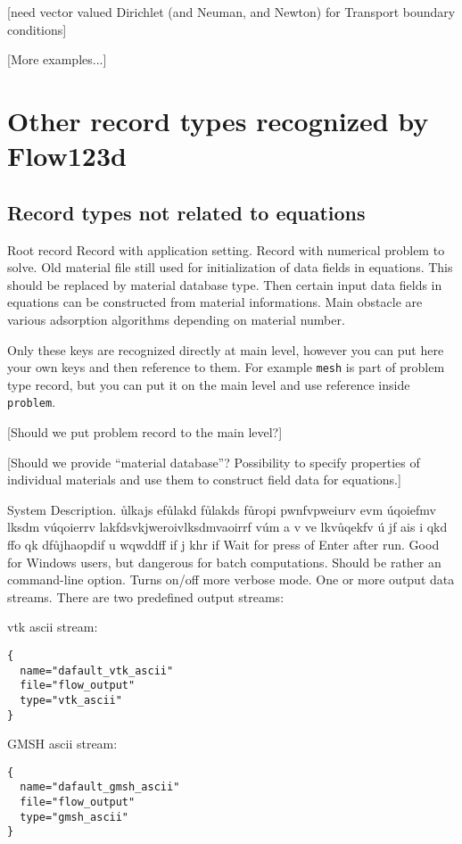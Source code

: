 [need vector valued Dirichlet (and Neuman, and Newton) for Transport boundary conditions]

[More examples...]


\section{Other record types recognized by Flow123d}

\subsection{Record types not related to equations}

\begin{recordtype}{Root record}{}
  Record with application setting.
  Record with numerical problem to solve. 
    Old material file still used for initialization of data fields in equations. 
    This should be replaced by material database type. Then certain input data fields in equations can be 
    constructed from material informations. Main obstacle are various adsorption algorithms depending on material number.
\end{recordtype}

Only these  keys are recognized directly at main level, however you can put here your own keys and then reference
to them. For example \verb'mesh' is part of problem type record, but you can put it on the main level and use reference 
inside \verb'problem'. 

[Should we put problem record to the main level?]

[Should we provide ``material database''? Possibility to specify properties of individual materials and use them to construct
 field data for equations.]

\begin{recordtype}{System}{}
Description. ůlkajs efůlakd fůlakds fůropi pwnfvpweiurv evm úqoiefmv lksdm vúqoierrv lakfdsvkjweroivlksdmvaoirrf vúm a v ve lkvůqekfv ú
jf ais i qkd ffo qk dfůjhaopdif  u wqwddff if j khr if
Wait for press of Enter after run. Good for Windows users, but dangerous for batch computations. 
Should be rather an command-line option.
Turns on/off more verbose mode. 
One or more output data streams.
There are two predefined output streams:


vtk ascii stream:
\begin{verbatim}
{
  name="dafault_vtk_ascii"
  file="flow_output"
  type="vtk_ascii"
}
\end{verbatim}

GMSH ascii stream:
\begin{verbatim}
{
  name="dafault_gmsh_ascii"
  file="flow_output"
  type="gmsh_ascii"
}
\end{verbatim}

\end{recordtype}

